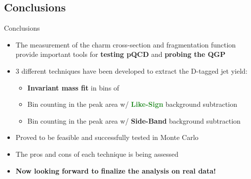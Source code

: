 \documentclass[xcolor={usenames,dvipsnames}]{beamer}
\begin{document}
\subsection*{Conclusions}
\begin{frame}{Conclusions}
\begin{itemize}
\item The measurement of the charm cross-section and fragmentation function provide important tools for
\textbf{\alert{testing pQCD}} and \textbf{\alert{probing the QGP}}
\item 3 different techniques have been developed to extract the D-tagged jet yield:
\begin{itemize}
\item \textbf{\textcolor{NavyBlue}{Invariant mass fit}} in bins of \ptjet
\item Bin counting in the peak area w/ \textbf{\textcolor{ForestGreen}{Like-Sign}} background subtraction
\item Bin counting in the peak area w/ \textbf{\textcolor{BrickRed}{Side-Band}} background subtraction
\end{itemize}
\item Proved to be \alert{feasible} and \alert{successfully tested} in Monte Carlo
\item The pros and cons of each technique is being assessed
\item \textbf{\alert{Now looking forward to finalize the analysis on real data!}}
\end{itemize}
\end{frame}
\end{document}
